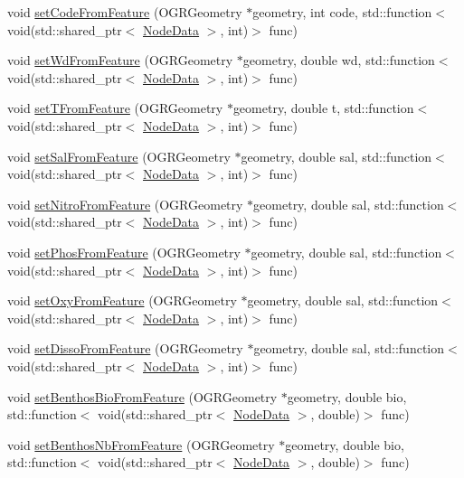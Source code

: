 \begin{DoxyCompactItemize}
\item 
void \mbox{\hyperlink{class_displace_model_af12c5d5a0118188de837bcc1665a06ba}{set\+Code\+From\+Feature}} (O\+G\+R\+Geometry $\ast$geometry, int code, std\+::function$<$ void(std\+::shared\+\_\+ptr$<$ \mbox{\hyperlink{class_node_data}{Node\+Data}} $>$, int)$>$ func)
\item 
void \mbox{\hyperlink{class_displace_model_a8d424f3fc69eff0d60f17df889602f9a}{set\+Wd\+From\+Feature}} (O\+G\+R\+Geometry $\ast$geometry, double wd, std\+::function$<$ void(std\+::shared\+\_\+ptr$<$ \mbox{\hyperlink{class_node_data}{Node\+Data}} $>$, int)$>$ func)
\item 
void \mbox{\hyperlink{class_displace_model_a5d1351b6d829f0fff88043a2a0aec912}{set\+T\+From\+Feature}} (O\+G\+R\+Geometry $\ast$geometry, double t, std\+::function$<$ void(std\+::shared\+\_\+ptr$<$ \mbox{\hyperlink{class_node_data}{Node\+Data}} $>$, int)$>$ func)
\item 
void \mbox{\hyperlink{class_displace_model_a8367eebe67878cf29f2e57fa863e1032}{set\+Sal\+From\+Feature}} (O\+G\+R\+Geometry $\ast$geometry, double sal, std\+::function$<$ void(std\+::shared\+\_\+ptr$<$ \mbox{\hyperlink{class_node_data}{Node\+Data}} $>$, int)$>$ func)
\item 
void \mbox{\hyperlink{class_displace_model_ac7542a6b577a006762bbb78e1834b868}{set\+Nitro\+From\+Feature}} (O\+G\+R\+Geometry $\ast$geometry, double sal, std\+::function$<$ void(std\+::shared\+\_\+ptr$<$ \mbox{\hyperlink{class_node_data}{Node\+Data}} $>$, int)$>$ func)
\item 
void \mbox{\hyperlink{class_displace_model_a520f1e660f1e2cd8fc24bf03d95f67b9}{set\+Phos\+From\+Feature}} (O\+G\+R\+Geometry $\ast$geometry, double sal, std\+::function$<$ void(std\+::shared\+\_\+ptr$<$ \mbox{\hyperlink{class_node_data}{Node\+Data}} $>$, int)$>$ func)
\item 
void \mbox{\hyperlink{class_displace_model_ae198fa5d4326d20b97d28c70d289effd}{set\+Oxy\+From\+Feature}} (O\+G\+R\+Geometry $\ast$geometry, double sal, std\+::function$<$ void(std\+::shared\+\_\+ptr$<$ \mbox{\hyperlink{class_node_data}{Node\+Data}} $>$, int)$>$ func)
\item 
void \mbox{\hyperlink{class_displace_model_a6269ebf1aa93a4451dd88e08a197f504}{set\+Disso\+From\+Feature}} (O\+G\+R\+Geometry $\ast$geometry, double sal, std\+::function$<$ void(std\+::shared\+\_\+ptr$<$ \mbox{\hyperlink{class_node_data}{Node\+Data}} $>$, int)$>$ func)
\item 
void \mbox{\hyperlink{class_displace_model_a2b59b9127344987d46aa9c89c9633ea4}{set\+Benthos\+Bio\+From\+Feature}} (O\+G\+R\+Geometry $\ast$geometry, double bio, std\+::function$<$ void(std\+::shared\+\_\+ptr$<$ \mbox{\hyperlink{class_node_data}{Node\+Data}} $>$, double)$>$ func)
\item 
void \mbox{\hyperlink{class_displace_model_a4a28b2c05b7732ce15e954e47b93454c}{set\+Benthos\+Nb\+From\+Feature}} (O\+G\+R\+Geometry $\ast$geometry, double bio, std\+::function$<$ void(std\+::shared\+\_\+ptr$<$ \mbox{\hyperlink{class_node_data}{Node\+Data}} $>$, double)$>$ func)
\end{DoxyCompactItemize}


